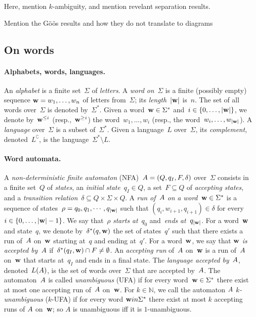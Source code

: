 Here, mention $k$-ambiguity, and mention revelant separation results.

Mention the Göös results and how they do not translate to diagrams


\subsection{On words}
\label{subsubsec:ufas-words}

\paragraph*{Alphabets, words, languages.}
An \emph{alphabet} is a finite set~$\Sigma$ of \emph{letters}.  A \emph{word
on~$\Sigma$} is a finite (possibly empty) sequence $\mathbf{w} = w_1,\ldots,w_n$ of
letters from~$\Sigma$; its \emph{length}~$|\mathbf{w}|$ is~$n$.  The set of all words
over~$\Sigma$ is denoted by~$\Sigma^*$.  Given a word~$\mathbf{w} \in \Sigma^*$ and~$i
\in \{0,\ldots,|\mathbf{w}|\}$, we denote by~$\mathbf{w}^{\leq i}$ (resp.,~$\mathbf{w}^{\geq i}$) the
word~$w_1,\ldots,w_i$ (resp., the word~$w_i,\ldots,w_{|\mathbf{w}|}$).  A \emph{
language} over~$\Sigma$ is a subset of~$\Sigma^*$. Given a language~$L$
over~$\Sigma$, its \emph{complement}, denoted~$L^\complement$, is the
language~$\Sigma^* \setminus L$.


\paragraph*{Word automata.}
A \emph{non-deterministic finite automaton} (NFA)~$A = (Q,q_I,F,\delta)$
over~$\Sigma$ consists in a finite set~$Q$ of \emph{states}, an \emph{initial
state}~$q_I \in Q$, a set~$F \subseteq Q$ of \emph{accepting states}, and a
\emph{transition relation}~$\delta \subseteq Q \times \Sigma \times Q$.  A
\emph{run of~$A$ on a word~$\mathbf{w}\in \Sigma^*$} is a sequence of states~$\rho =
q_0, q_1, \cdots, q_{|\mathbf{w}|}$ such that $(q_i, w_{i+1}, q_{i+1}) \in \delta$ for
every~$i \in \{0,\ldots,|\mathbf{w}|-1\}$. We say that~$\rho$ \emph{starts at~$q_0$}
and~\emph{ends at~$q_{|\mathbf{w}|}$}.  For a word~$\mathbf{w}$ and state~$q$, we denote
by~$\delta^*(q,\mathbf{w})$ the set of states~$q'$ such that there exists a run of~$A$
on~$\mathbf{w}$ starting at~$q$ and ending at~$q'$.  For a word~$\mathbf{w}$, we say that
\emph{$\mathbf{w}$ is accepted by~$A$} if~$\delta^*(q_I,\mathbf{w}) \cap F \neq \emptyset$.
An \emph{accepting run} of~$A$ on~$\mathbf{w}$ is a run of~$A$ on~$\mathbf{w}$ that starts
at~$q_I$ and ends in a final state.
The \emph{language accepted by~$A$}, denoted~$L(A)$, is the set of words
over~$\Sigma$ that are accepted by~$A$.  The automaton~$A$ is called
\emph{unambiguous} (UFA) if for every word~$\mathbf{w} \in \Sigma^*$ there exist at
most one accepting run of~$A$ on~$\mathbf{w}$.
For $k \in \mathbb{N}$, we call the automaton $A$ \emph{$k$-unambiguous} ($k$-UFA) if for every word $\mathbf{w} in \Sigma^*$ there exist  at most $k$ accepting runs of $A$ on~$\mathbf{w}$; so $A$ is unambiguous iff it is $1$-unambiguous.

